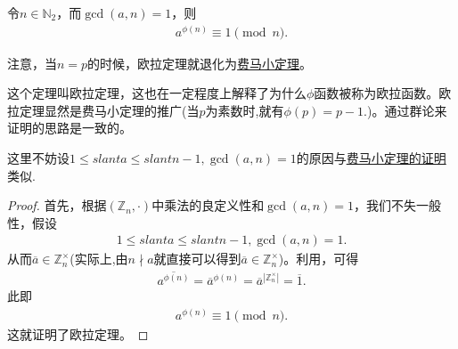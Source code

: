 \documentclass[../../main.tex]{subfiles}
\begin{document}
\begin{theorem}[Euler定理]\label{theorem:Euler定理}
令$n \in \mathbb{N}_2$，而$\gcd(a, n) = 1$，则
\begin{align*}
a^{\phi(n)} \equiv 1 \pmod{n}.
\end{align*}
\end{theorem}
\begin{remark}
注意，当$n = p$的时候，欧拉定理就退化为\hyperref[theorem:Fermat小定理]{费马小定理}。 
\end{remark}
\begin{note}
这个定理叫欧拉定理，这也在一定程度上解释了为什么$\phi$函数被称为欧拉函数。欧拉定理显然是费马小定理的推广(当$p$为素数时,就有$\phi (p)=p-1.$)。通过群论来证明的思路是一致的。
\end{note}
\begin{remark}
这里不妨设$1 \leqslant slant a \leqslant slant n - 1, \gcd(a, n) = 1 $的原因与\hyperref[theorem:Fermat小定理]{费马小定理的证明}类似.
\end{remark}
\begin{proof}
首先，根据$(\mathbb{Z}_n, \cdot)$中乘法的良定义性和$\gcd(a, n) = 1$，我们不失一般性，假设
\begin{align*}
1 \leqslant slant a \leqslant slant n - 1, \gcd(a, n) = 1 .
\end{align*}
从而$\overline{a} \in \mathbb{Z}_n^\times$(实际上,由$n \nmid a$就直接可以得到$\overline{a} \in \mathbb{Z}_n^\times$)。利用，可得
\begin{align*}
\overline{a^{\phi(n)}}=\overline{a}^{\phi(n)}=\overline{a}^{|\mathbb{Z}_n^\times|} = \overline{1} .
\end{align*}
此即
\begin{align*}
a^{\phi(n)} \equiv 1 \pmod{n} .
\end{align*}
这就证明了欧拉定理。
\end{proof}
\end{document}
